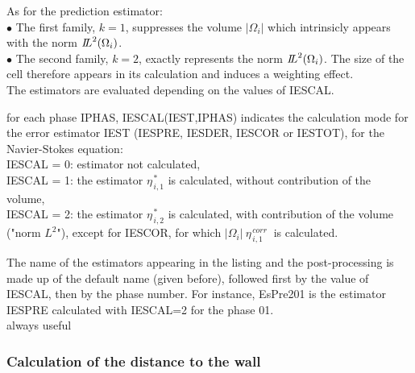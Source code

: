 As for the prediction estimator:\\
\hspace*{0.5cm}$\bullet$ The first family, $k=1$, suppresses the
volume $|\Omega_i|$ which intrinsicly appears  with the norm
${{I\hspace{-.25em}L}^{2}(\Omega_i)}$.\\
\hspace*{0.5cm}$\bullet$ The second family, $k=2$, exactly represents the norm
${{I\hspace{-.25em}L}^{2}(\Omega_i)}$. The size of the cell therefore
appears in its calculation and induces a weighting effect.\\


The estimators are evaluated depending on the values of IESCAL.


{for each phase IPHAS, IESCAL(IEST,IPHAS) indicates the calculation mode
for the error estimator IEST (IESPRE, IESDER, IESCOR or IESTOT), for
the Navier-Stokes equation:\\
 IESCAL = 0: estimator not calculated, \\
 IESCAL = 1: the estimator $ \eta^{\,* }_{\,i,1}$ is calculated,
               without contribution of the volume, \\
 IESCAL = 2: the estimator $ \eta^{\,* }_{\,i,2}$ is calculated,
               with contribution of the volume ("norm $L^2$"),
               except for IESCOR, for which
               $|\Omega_i|\ \eta^{\,corr}_{\,i,1}\ $
               is calculated.

The name of the estimators appearing in the listing and the post-processing is
made up of the default name (given before), followed first by the value of
IESCAL, then by the phase number. For
instance, EsPre201 is the estimator IESPRE calculated with IESCAL=2 for
the phase 01.\\
always useful}



\subsubsection{Calculation of the distance to the wall}

